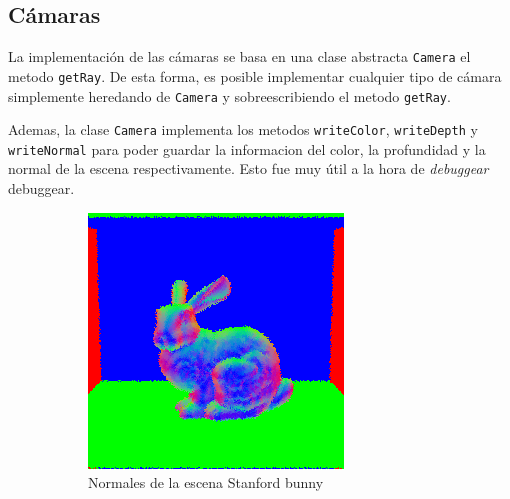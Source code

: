 \documentclass{article}
\begin{document}
\subsection{Cámaras}

La implementación de las cámaras se basa en una clase abstracta \texttt{Camera} 
el metodo \texttt{getRay}. De esta forma, es posible implementar cualquier tipo
de cámara simplemente heredando de \texttt{Camera} y sobreescribiendo el metodo
\texttt{getRay}.

Ademas, la clase \texttt{Camera} implementa los metodos \texttt{writeColor},
\texttt{writeDepth} y \texttt{writeNormal} para poder guardar la informacion del
color, la profundidad y la normal de la escena respectivamente. Esto fue muy
útil a la hora de \textit{debuggear} debuggear.

\begin{figure}[H]
  \begin{subfigure}[h]{0.4\linewidth}
    \includegraphics[width=\linewidth]{imgs/normal.png}
    \caption{Normales de la escena Stanford bunny}
  \end{subfigure}
  \hfill
  \begin{subfigure}[h]{0.4\linewidth}

\end{subfigure}
\end{figure}
\end{document}
